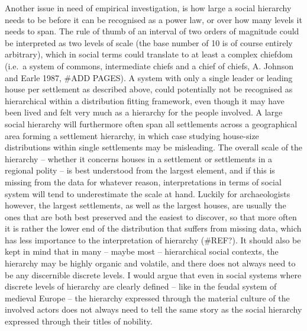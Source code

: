 \documentclass[
  12pt,
  a4paper, twoside]{book}
\begin{document}
Another issue in need of empirical investigation, is how large a social hierarchy needs to be before it can be recognised as a power law, or over how many levels it needs to span. The rule of thumb of an interval of two orders of magnitude could be interpreted as two levels of scale (the base number of 10 is of course entirely arbitrary), which in social terms could translate to at least a complex chiefdom (i.e.~a system of commons, intermediate chiefs and a chief of chiefs, A. Johnson and Earle 1987, \#ADD PAGES). A system with only a single leader or leading house per settlement as described above, could potentially not be recognised as hierarchical within a distribution fitting framework, even though it may have been lived and felt very much as a hierarchy for the people involved. A large social hierarchy will furthermore often span all settlements across a geographical area forming a settlement hierarchy, in which case studying house-size distributions within single settlements may be misleading. The overall scale of the hierarchy -- whether it concerns houses in a settlement or settlements in a regional polity -- is best understood from the largest element, and if this is missing from the data for whatever reason, interpretations in terms of social system will tend to underestimate the scale at hand. Luckily for archaeologists however, the largest settlements, as well as the largest houses, are usually the ones that are both best preserved and the easiest to discover, so that more often it is rather the lower end of the distribution that suffers from missing data, which has less importance to the interpretation of hierarchy (\#REF?). It should also be kept in mind that in many -- maybe most -- hierarchical social contexts, the hierarchy may be highly organic and volatile, and there does not always need to be any discernible discrete levels. I would argue that even in social systems where discrete levels of hierarchy are clearly defined -- like in the feudal system of medieval Europe -- the hierarchy expressed through the material culture of the involved actors does not always need to tell the same story as the social hierarchy expressed through their titles of nobility.
\end{document}
